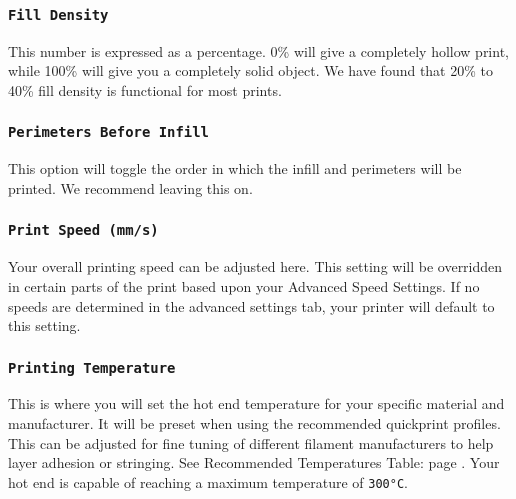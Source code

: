 \subsubsection{\texttt{Fill Density}}
This number is expressed as a percentage. 0\% will give a completely hollow print, while 100\% will give you a completely solid object. We have found that 20\% to 40\% fill density is functional for most prints.

\subsubsection{\texttt{Perimeters Before Infill}}
This option will toggle the order in which the infill and perimeters will be printed. We recommend leaving this on.

\subsubsection{\texttt{Print Speed (mm/s)}}
Your overall printing speed can be adjusted here. This setting will be overridden in certain parts of the print based upon your Advanced Speed Settings. If no speeds are determined in the advanced settings tab, your printer will default to this setting.

\subsubsection{\texttt{Printing Temperature}}
This is where you will set the hot end temperature for your specific material and manufacturer. It will be preset when using the recommended quickprint profiles. This can be adjusted for fine tuning of different filament manufacturers to help layer adhesion or stringing. See Recommended Temperatures Table: page \pageref{tab:a}. Your hot end is capable of reaching a maximum temperature of \texttt{300°C}.


